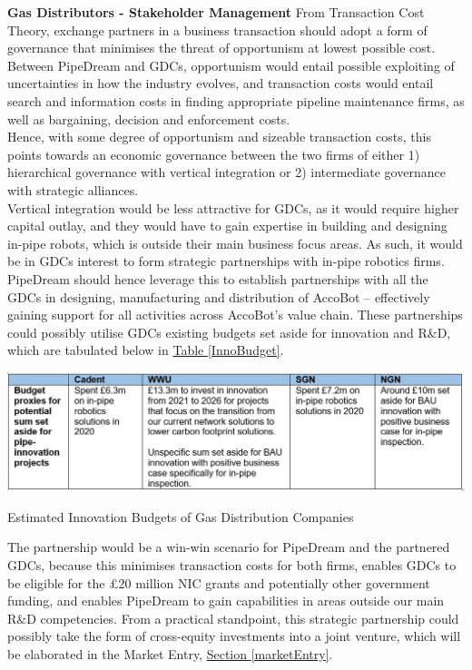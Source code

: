 \documentclass[11pt]{article}		%
\newcommand{\tableref}[1]{\hyperref[#1]{Table \ref*{#1}}}     %
\newcommand{\sectref}[1]{\hyperref[#1]{Section \ref*{#1}}}     %
\begin{document}
        \textbf{Gas Distributors - Stakeholder Management}
	    From Transaction Cost Theory, exchange partners in a business transaction should adopt a form of governance that minimises the threat of opportunism at lowest possible cost. Between PipeDream and GDCs, opportunism would entail possible exploiting of uncertainties in how the industry evolves, and transaction costs would entail search and information costs in finding appropriate pipeline maintenance firms, as well as bargaining, decision and enforcement costs. 
         \\ \hspace*{3ex}Hence, with some degree of opportunism and sizeable transaction costs, this points towards an economic governance between the two firms of either 1) hierarchical governance with vertical integration or 2) intermediate governance with strategic alliances. 
         \\ \hspace*{3ex}Vertical integration would be less attractive for GDCs, as it would require higher capital outlay, and they would have to gain expertise in building and designing in-pipe robots, which is outside their main business focus areas. As such, it would be in GDCs interest to form strategic partnerships with in-pipe robotics firms. 
         \\ \hspace*{3ex}PipeDream should hence leverage this to establish partnerships with all the GDCs in designing, manufacturing and distribution of AccoBot – effectively gaining support for all activities across AccoBot’s value chain.  These partnerships could possibly utilise GDCs existing budgets set aside for innovation and R\&D, which are tabulated below in \tableref{InnoBudget}. 
        \begin{table}[H]
					\centering
					\includegraphics[width=\textwidth]{InnoBudget.jpg}
					\caption{Estimated Innovation Budgets of Gas Distribution Companies}
					\label{InnoBudget}
				\end{table}
		The partnership would be a win-win scenario for PipeDream and the partnered GDCs, because this minimises transaction costs for both firms, enables GDCs to be eligible for the £20 million NIC grants and potentially other government funding, and enables PipeDream to gain capabilities in areas outside our main R\&D competencies. From a practical standpoint, this strategic partnership could possibly take the form of cross-equity investments into a joint venture, which will be elaborated in the Market Entry, \sectref{marketEntry}.
		
\end{document}
